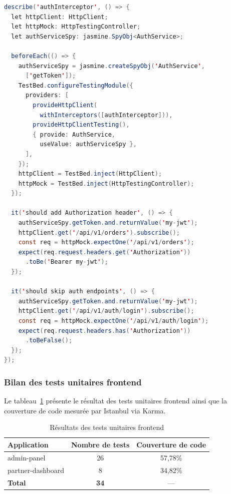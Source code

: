 \begin{lstlisting}[language=Java, caption={Test de l'intercepteur HTTP -- auth.interceptor.spec.ts}, label={lst:auth-interceptor-spec}]
describe('authInterceptor', () => {
  let httpClient: HttpClient;
  let httpMock: HttpTestingController;
  let authServiceSpy: jasmine.SpyObj<AuthService>;

  beforeEach(() => {
    authServiceSpy = jasmine.createSpyObj('AuthService',
      ['getToken']);
    TestBed.configureTestingModule({
      providers: [
        provideHttpClient(
          withInterceptors([authInterceptor])),
        provideHttpClientTesting(),
        { provide: AuthService,
          useValue: authServiceSpy },
      ],
    });
    httpClient = TestBed.inject(HttpClient);
    httpMock = TestBed.inject(HttpTestingController);
  });

  it('should add Authorization header', () => {
    authServiceSpy.getToken.and.returnValue('my-jwt');
    httpClient.get('/api/v1/orders').subscribe();
    const req = httpMock.expectOne('/api/v1/orders');
    expect(req.request.headers.get('Authorization'))
      .toBe('Bearer my-jwt');
  });

  it('should skip auth endpoints', () => {
    authServiceSpy.getToken.and.returnValue('my-jwt');
    httpClient.get('/api/v1/auth/login').subscribe();
    const req = httpMock.expectOne('/api/v1/auth/login');
    expect(req.request.headers.has('Authorization'))
      .toBeFalse();
  });
});
\end{lstlisting}

\subsubsection{Bilan des tests unitaires frontend}

Le tableau~\ref{tab:unit-tests-frontend} présente le résultat des tests unitaires
frontend ainsi que la couverture de code mesurée par Istanbul via Karma.

\begin{table}[H]
\centering
\caption{Résultats des tests unitaires frontend}
\label{tab:unit-tests-frontend}
\begin{tabular}{l c c}
\toprule
\textbf{Application} & \textbf{Nombre de tests} & \textbf{Couverture de code} \\
\midrule
admin-panel         & 26 & 57,78\% \\
partner-dashboard   &  8 & 34,82\% \\
\midrule
\textbf{Total}      & \textbf{34} & --- \\
\bottomrule
\end{tabular}
\end{table}

